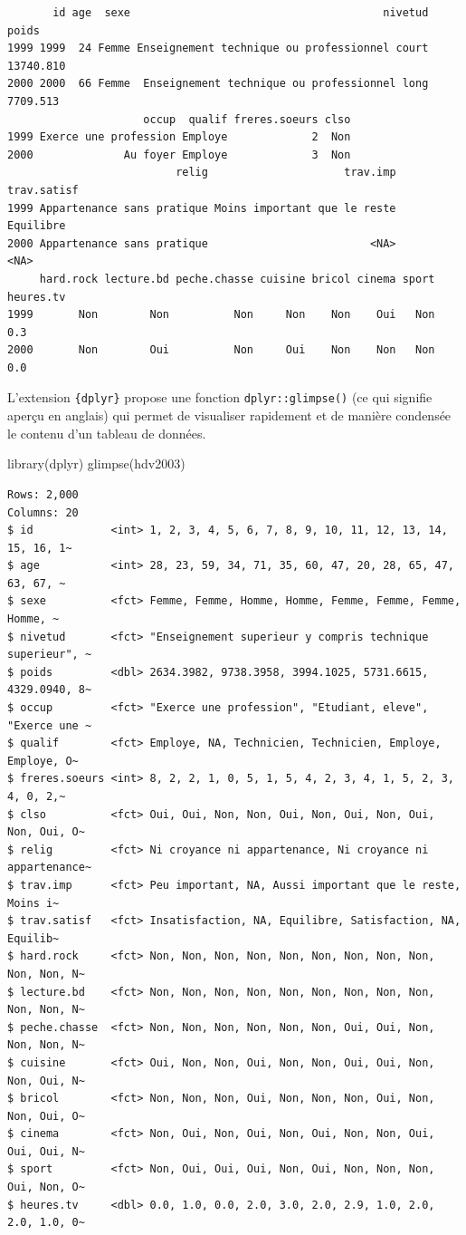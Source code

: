 \documentclass[
  letterpaper,
  DIV=11,
  numbers=noendperiod,
  oneside]{scrreprt}
\newenvironment{Shaded}{\begin{snugshade}}{\end{snugshade}}
\newcommand{\FunctionTok}[1]{\textcolor[rgb]{0.28,0.35,0.67}{#1}}
\newcommand{\NormalTok}[1]{\textcolor[rgb]{0.00,0.23,0.31}{#1}}
\begin{document}
\begin{verbatim}
       id age  sexe                                       nivetud     poids
1999 1999  24 Femme Enseignement technique ou professionnel court 13740.810
2000 2000  66 Femme  Enseignement technique ou professionnel long  7709.513
                     occup  qualif freres.soeurs clso
1999 Exerce une profession Employe             2  Non
2000              Au foyer Employe             3  Non
                          relig                     trav.imp trav.satisf
1999 Appartenance sans pratique Moins important que le reste   Equilibre
2000 Appartenance sans pratique                         <NA>        <NA>
     hard.rock lecture.bd peche.chasse cuisine bricol cinema sport heures.tv
1999       Non        Non          Non     Non    Non    Oui   Non       0.3
2000       Non        Oui          Non     Oui    Non    Non   Non       0.0
\end{verbatim}

L'extension \texttt{\{dplyr\}} propose une fonction
\texttt{dplyr::glimpse()} (ce qui signifie aperçu en anglais) qui permet
de visualiser rapidement et de manière condensée le contenu d'un tableau
de données.

\begin{Shaded}
\begin{Highlighting}[]
\FunctionTok{library}\NormalTok{(dplyr)}
\FunctionTok{glimpse}\NormalTok{(hdv2003)}
\end{Highlighting}
\end{Shaded}

\begin{verbatim}
Rows: 2,000
Columns: 20
$ id            <int> 1, 2, 3, 4, 5, 6, 7, 8, 9, 10, 11, 12, 13, 14, 15, 16, 1~
$ age           <int> 28, 23, 59, 34, 71, 35, 60, 47, 20, 28, 65, 47, 63, 67, ~
$ sexe          <fct> Femme, Femme, Homme, Homme, Femme, Femme, Femme, Homme, ~
$ nivetud       <fct> "Enseignement superieur y compris technique superieur", ~
$ poids         <dbl> 2634.3982, 9738.3958, 3994.1025, 5731.6615, 4329.0940, 8~
$ occup         <fct> "Exerce une profession", "Etudiant, eleve", "Exerce une ~
$ qualif        <fct> Employe, NA, Technicien, Technicien, Employe, Employe, O~
$ freres.soeurs <int> 8, 2, 2, 1, 0, 5, 1, 5, 4, 2, 3, 4, 1, 5, 2, 3, 4, 0, 2,~
$ clso          <fct> Oui, Oui, Non, Non, Oui, Non, Oui, Non, Oui, Non, Oui, O~
$ relig         <fct> Ni croyance ni appartenance, Ni croyance ni appartenance~
$ trav.imp      <fct> Peu important, NA, Aussi important que le reste, Moins i~
$ trav.satisf   <fct> Insatisfaction, NA, Equilibre, Satisfaction, NA, Equilib~
$ hard.rock     <fct> Non, Non, Non, Non, Non, Non, Non, Non, Non, Non, Non, N~
$ lecture.bd    <fct> Non, Non, Non, Non, Non, Non, Non, Non, Non, Non, Non, N~
$ peche.chasse  <fct> Non, Non, Non, Non, Non, Non, Oui, Oui, Non, Non, Non, N~
$ cuisine       <fct> Oui, Non, Non, Oui, Non, Non, Oui, Oui, Non, Non, Oui, N~
$ bricol        <fct> Non, Non, Non, Oui, Non, Non, Non, Oui, Non, Non, Oui, O~
$ cinema        <fct> Non, Oui, Non, Oui, Non, Oui, Non, Non, Oui, Oui, Oui, N~
$ sport         <fct> Non, Oui, Oui, Oui, Non, Oui, Non, Non, Non, Oui, Non, O~
$ heures.tv     <dbl> 0.0, 1.0, 0.0, 2.0, 3.0, 2.0, 2.9, 1.0, 2.0, 2.0, 1.0, 0~
\end{verbatim}
\end{document}
